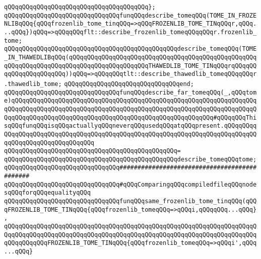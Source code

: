 \verb|qQQqqQQqqQQqqQQqqQQqqQQqqQQqqQQqqQQqqQQq};|\newline
\newline
\newline
\newline
\verb|qQQqqQQqqQQqqQQqqQQqqQQqqQQqqQQqfunqQQqdescribe_tomeqQQq(TOME_IN_FROZENLIBqQQq{qQQqfrozenlib_tome_tinqQQq=>qQQqFROZENLIB_TOME_TINqQQqr,qQQq...qQQq})qQQq=>qQQqqQQqflt::describe_frozenlib_tomeqQQqqQQqr.frozenlib_tome;|\newline
\verb|qQQqqQQqqQQqqQQqqQQqqQQqqQQqqQQqqQQqqQQqqQQqqQQqdescribe_tomeqQQq(TOME_IN_THAWEDLIBqQQq(qQQqqQQqqQQqqQQqqQQqqQQqqQQqqQQqqQQqqQQqqQQqqQQqqQQqqQQqqQQqqQQqqQQqqQQqqQQqqQQqqQQqqQQqqQQqTHAWEDLIB_TOME_TINqQQqrqQQqqQQqqQQqqQQqqQQqqQQq))qQQq=>qQQqqQQqtlt::describe_thawedlib_tomeqQQqqQQqr.thawedlib_tome;|\newline
\verb|qQQqqQQqqQQqqQQqqQQqqQQqqQQqqQQqend;|\newline
\newline
\verb|qQQqqQQqqQQqqQQqqQQqqQQqqQQqqQQqfunqQQqdescribe_far_tomeqQQq(_,qQQqtome)qQQqqQQqqQQqqQQqqQQqqQQqqQQqqQQqqQQqqQQqqQQqqQQqqQQqqQQqqQQqqQQqqQQqqQQqqQQqqQQqqQQqqQQqqQQqqQQqqQQqqQQqqQQqqQQqqQQqqQQqqQQqqQQqqQQqqQQqqQQqqQQqqQQqqQQqqQQqqQQqqQQqqQQqqQQqqQQqqQQqqQQqqQQqqQQqqQQq#qQQqqQQqThisqQQqfunqQQqisqQQqactuallyqQQqneverqQQqusedqQQqatqQQqpresent.qQQqqQQqqQQqqQQqqQQqqQQqqQQqqQQqqQQqqQQqqQQqqQQqqQQqqQQqqQQqqQQqqQQqqQQqqQQqqQQqqQQqqQQqqQQqqQQqqQQqqQQq|\newline
\verb|qQQqqQQqqQQqqQQqqQQqqQQqqQQqqQQqqQQqqQQqqQQqqQQq=|\newline
\verb|qQQqqQQqqQQqqQQqqQQqqQQqqQQqqQQqqQQqqQQqqQQqqQQqdescribe_tomeqQQqtome;|\newline
\newline
\newline
\newline
\verb|qQQqqQQqqQQqqQQqqQQqqQQqqQQqqQQq#############################################|\newline
\verb|qQQqqQQqqQQqqQQqqQQqqQQqqQQqqQQq#qQQqComparingqQQqcompiledfileqQQqnodesqQQqforqQQqequalityqQQq|\newline
\newline
\newline
\verb|qQQqqQQqqQQqqQQqqQQqqQQqqQQqqQQqfunqQQqsame_frozenlib_tome_tinqQQq(qQQqFROZENLIB_TOME_TINqQQq{qQQqfrozenlib_tomeqQQq=>qQQqi,qQQqqQQq...qQQq},|\newline
\verb|qQQqqQQqqQQqqQQqqQQqqQQqqQQqqQQqqQQqqQQqqQQqqQQqqQQqqQQqqQQqqQQqqQQqqQQqqQQqqQQqqQQqqQQqqQQqqQQqqQQqqQQqqQQqqQQqqQQqqQQqqQQqqQQqqQQqqQQqqQQqqQQqqQQqqQQqFROZENLIB_TOME_TINqQQq{qQQqfrozenlib_tomeqQQq=>qQQqi',qQQq...qQQq}|\newline
